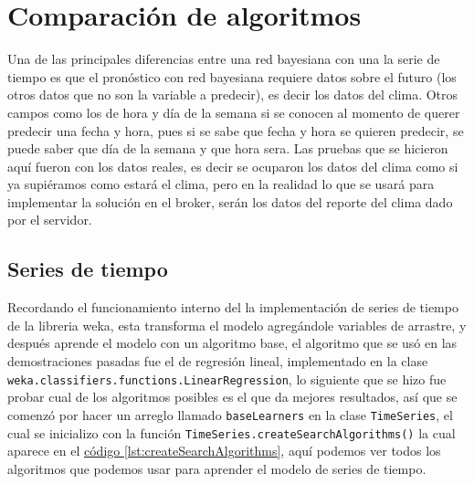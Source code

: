 \section{Comparación de algoritmos} \label{sec:comparacion}
Una de las principales diferencias entre una red bayesiana con una la serie de tiempo es que el pronóstico con red bayesiana requiere datos sobre el futuro (los otros datos que no son la variable a predecir), es decir los datos del clima. Otros campos como los de hora y día de la semana si se conocen al momento de querer predecir una fecha y hora, pues si se sabe que fecha y hora se quieren predecir, se puede saber que día de la semana y que hora sera.
Las pruebas que se hicieron aquí fueron con los datos reales, es decir se ocuparon los datos del clima como si ya supiéramos como estará el clima, pero en la realidad lo que se usará para implementar la solución en el broker, serán los datos del reporte del clima dado por el servidor.

\subsection{Series de tiempo} \label{subsec:compSeries}
Recordando el funcionamiento interno del la implementación de series de tiempo de la libreria weka, esta transforma el modelo agregándole variables de arrastre, y después aprende el modelo con un algoritmo base, el algoritmo que se usó en las demostraciones pasadas fue el de regresión lineal, implementado en la clase 
\texttt{weka.classifiers.functions.LinearRegression}, lo siguiente que se hizo fue probar cual de los algoritmos posibles es el que da mejores resultados, así que se comenzó por hacer un arreglo llamado \texttt{baseLearners} en la clase \texttt{TimeSeries}, el cual se inicializo con la función \texttt{TimeSeries.createSearchAlgorithms()} la cual aparece en el 
\hyperref[lst:createSearchAlgorithms]{ código \ref{lst:createSearchAlgorithms}}, aquí podemos ver todos los algoritmos que podemos usar para aprender el modelo de series de tiempo. %


